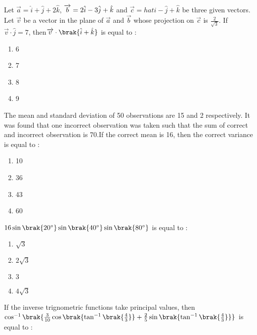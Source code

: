 \iffalse
\title{Assignment 3}
\author{AI24BTECH11018}
\section{mcq-single}
\fi

    \item[1.] Let $\overrightarrow{a}=\hat{i}+\hat{j}+2\hat{k}$, $\overrightarrow{b}=2\hat{i}-3\Hat{j}+\hat{k}$ and $\overrightarrow{c}=hat{i}-\hat{j}+\hat{k}$ be three given vectors. Let $\overrightarrow{v}$ be a vector in the plane of $\overrightarrow{a}$ and $\overrightarrow{b}$ whose projection on $\overrightarrow{c}$ is $\frac{2}{\sqrt{3}}$. If $\overrightarrow{v}\cdot\hat{j}=7$, then$\overrightarrow{v}\cdot\brak{\hat{i}+\hat{k}}$ is equal to :
    \begin{enumerate}
        \item 6
        \item 7
        \item 8
        \item 9
    \end{enumerate}
    \hfill{}
    \item[2.] The mean and standard deviation of 50 observations are 15 and 2 respectively. It was found that one incorrect observation was taken such that the sum of correct and incorrect observation is 70.If the correct mean is 16, then the correct variance is equal to :
    \begin{enumerate}
        \item 10
        \item 36
        \item 43
        \item 60
    \end{enumerate}
    \hfill{}
    \item[3.] $16\sin{\brak{20^\circ}}\sin{\brak{40^\circ}}\sin{\brak{80^\circ}}$ is equal to :
    \begin{enumerate}
        \item $\sqrt{3}$
        \item $2\sqrt{3}$
        \item $3$
        \item $4\sqrt{3}$
    \end{enumerate}
    \hfill{}
    \item[4.] If the inverse trignometric functions take principal values, then $\cos^{-1}\brak{\frac{3}{10}\cos\brak{\tan^{-1}\brak{\frac{4}{3}}}+\frac{2}{5}\sin\brak{\tan^{-1}\brak{\frac{4}{3}}}}$ is equal to :
